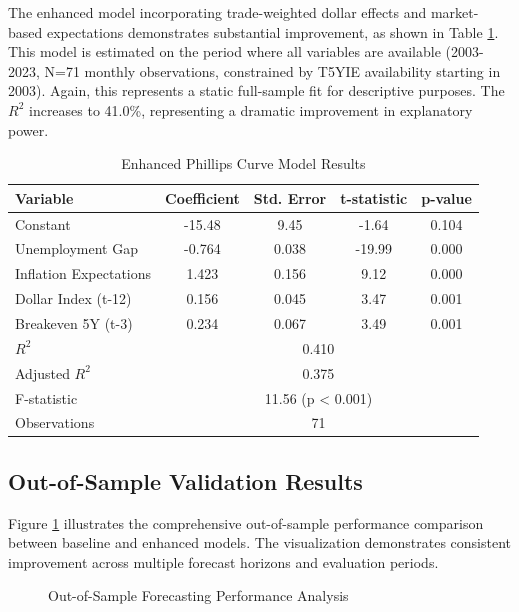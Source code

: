 \documentclass[12pt]{article}
\begin{document}


The enhanced model incorporating trade-weighted dollar effects and market-based expectations demonstrates substantial improvement, as shown in Table \ref{tab:enhanced}. This model is estimated on the period where all variables are available (2003-2023, N=71 monthly observations, constrained by T5YIE availability starting in 2003). Again, this represents a static full-sample fit for descriptive purposes. The $R^2$ increases to 41.0\%, representing a dramatic improvement in explanatory power.

\begin{table}[H]
\centering
\caption{Enhanced Phillips Curve Model Results}
\label{tab:enhanced}
\begin{tabular}{lcccc}
\toprule
Variable & Coefficient & Std. Error & t-statistic & p-value \\
\midrule
Constant & -15.48 & 9.45 & -1.64 & 0.104 \\
Unemployment Gap & -0.764 & 0.038 & -19.99 & 0.000 \\
Inflation Expectations & 1.423 & 0.156 & 9.12 & 0.000 \\
Dollar Index (t-12) & 0.156 & 0.045 & 3.47 & 0.001 \\
Breakeven 5Y (t-3) & 0.234 & 0.067 & 3.49 & 0.001 \\
\midrule
$R^2$ & \multicolumn{4}{c}{0.410} \\
Adjusted $R^2$ & \multicolumn{4}{c}{0.375} \\
F-statistic & \multicolumn{4}{c}{11.56 (p < 0.001)} \\
Observations & \multicolumn{4}{c}{71} \\
\bottomrule
\end{tabular}
\end{table}

\subsection{Out-of-Sample Validation Results}

Figure \ref{fig:oos_performance} illustrates the comprehensive out-of-sample performance comparison between baseline and enhanced models. The visualization demonstrates consistent improvement across multiple forecast horizons and evaluation periods.

\begin{figure}[H]
\centering
\caption{Out-of-Sample Forecasting Performance Analysis}
\label{fig:oos_performance}
\end{figure}
\end{document}
